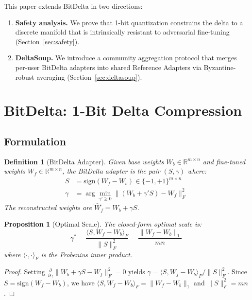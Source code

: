 \documentclass[11pt,letterpaper]{article}
\newtheorem{proposition}[theorem]{Proposition}
\newtheorem{definition}{Definition}[section]
\newcommand{\R}{\mathbb{R}}
\begin{document}
This paper extends BitDelta in two directions:

\begin{enumerate}
    \item \textbf{Safety analysis.} We prove that 1-bit quantization constrains the delta to a discrete manifold that is intrinsically resistant to adversarial fine-tuning (Section~\ref{sec:safety}).
    \item \textbf{DeltaSoup.} We introduce a community aggregation protocol that merges per-user BitDelta adapters into shared Reference Adapters via Byzantine-robust averaging (Section~\ref{sec:deltasoup}).
\end{enumerate}

\section{BitDelta: 1-Bit Delta Compression}
\label{sec:bitdelta}

\subsection{Formulation}

\begin{definition}[BitDelta Adapter]
Given base weights $W_b \in \R^{m \times n}$ and fine-tuned weights $W_f \in \R^{m \times n}$, the BitDelta adapter is the pair $(S, \gamma)$ where:
\begin{align}
S &= \text{sign}(W_f - W_b) \in \{-1, +1\}^{m \times n} \\
\gamma &= \arg\min_{\gamma' \geq 0} \| (W_b + \gamma' S) - W_f \|_F^2
\end{align}
The reconstructed weights are $\hat{W}_f = W_b + \gamma S$.
\end{definition}

\begin{proposition}[Optimal Scale]
\label{prop:scale}
The closed-form optimal scale is:
\begin{equation}
\gamma^* = \frac{\langle S, W_f - W_b \rangle_F}{\|S\|_F^2} = \frac{\|W_f - W_b\|_1}{mn}
\end{equation}
where $\langle \cdot, \cdot \rangle_F$ is the Frobenius inner product.
\end{proposition}

\begin{proof}
Setting $\frac{\partial}{\partial \gamma}\|W_b + \gamma S - W_f\|_F^2 = 0$ yields $\gamma = \langle S, W_f - W_b \rangle_F / \|S\|_F^2$. Since $S = \text{sign}(W_f - W_b)$, we have $\langle S, W_f - W_b \rangle_F = \|W_f - W_b\|_1$ and $\|S\|_F^2 = mn$.
\end{proof}
\end{document}
